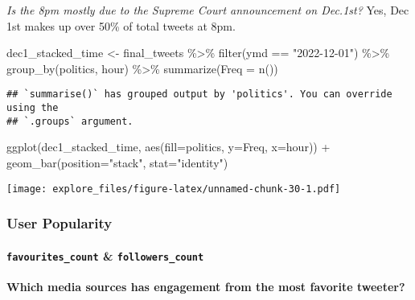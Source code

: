 \documentclass[
]{article}
\newenvironment{Shaded}{\begin{snugshade}}{\end{snugshade}}
\newcommand{\AttributeTok}[1]{\textcolor[rgb]{0.77,0.63,0.00}{#1}}
\newcommand{\FunctionTok}[1]{\textcolor[rgb]{0.00,0.00,0.00}{#1}}
\newcommand{\NormalTok}[1]{#1}
\newcommand{\OtherTok}[1]{\textcolor[rgb]{0.56,0.35,0.01}{#1}}
\newcommand{\SpecialCharTok}[1]{\textcolor[rgb]{0.00,0.00,0.00}{#1}}
\newcommand{\StringTok}[1]{\textcolor[rgb]{0.31,0.60,0.02}{#1}}
\begin{document}
\emph{Is the 8pm mostly due to the Supreme Court announcement on
Dec.1st?} Yes, Dec 1st makes up over 50\% of total tweets at 8pm.

\begin{Shaded}
\begin{Highlighting}[]
\NormalTok{dec1\_stacked\_time }\OtherTok{\textless{}{-}}\NormalTok{ final\_tweets }\SpecialCharTok{\%\textgreater{}\%} \FunctionTok{filter}\NormalTok{(ymd }\SpecialCharTok{==} \StringTok{"2022{-}12{-}01"}\NormalTok{) }\SpecialCharTok{\%\textgreater{}\%} 
  \FunctionTok{group\_by}\NormalTok{(politics, hour) }\SpecialCharTok{\%\textgreater{}\%} \FunctionTok{summarize}\NormalTok{(}\AttributeTok{Freq =} \FunctionTok{n}\NormalTok{())}
\end{Highlighting}
\end{Shaded}

\begin{verbatim}
## `summarise()` has grouped output by 'politics'. You can override using the
## `.groups` argument.
\end{verbatim}

\begin{Shaded}
\begin{Highlighting}[]
\FunctionTok{ggplot}\NormalTok{(dec1\_stacked\_time, }\FunctionTok{aes}\NormalTok{(}\AttributeTok{fill=}\NormalTok{politics, }\AttributeTok{y=}\NormalTok{Freq, }\AttributeTok{x=}\NormalTok{hour)) }\SpecialCharTok{+} 
    \FunctionTok{geom\_bar}\NormalTok{(}\AttributeTok{position=}\StringTok{"stack"}\NormalTok{, }\AttributeTok{stat=}\StringTok{"identity"}\NormalTok{)}
\end{Highlighting}
\end{Shaded}

\texttt{[image: explore\_files/figure-latex/unnamed-chunk-30-1.pdf]}

\hypertarget{user-popularity}{%
\subsubsection{User Popularity}\label{user-popularity}}

\hypertarget{favourites_count-followers_count}{%
\paragraph{\texorpdfstring{\texttt{favourites\_count} \&
\texttt{followers\_count}}{favourites\_count \& followers\_count}}\label{favourites_count-followers_count}}

\textbf{Which media sources has engagement from the most favorite
tweeter?}
\end{document}
